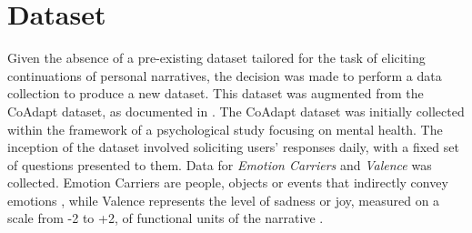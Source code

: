 
\section{Dataset}
Given the absence of a pre-existing dataset tailored for the task of eliciting continuations of personal narratives, the decision was made to perform a data collection to produce a new dataset. This dataset was augmented from the CoAdapt dataset, as documented in \cite{coadapt}. The CoAdapt dataset was initially collected within the framework of a psychological study focusing on mental health. The inception of the dataset involved soliciting users' responses daily, with a fixed set of questions presented to them. Data for \emph{Emotion Carriers} and \emph{Valence} was collected. Emotion Carriers are people, objects or events that indirectly convey emotions \cite{tammewarannotation}, while Valence represents the level of sadness or joy, measured on a scale from -2 to +2, of functional units of the narrative \cite{Ong2021-yt,roccabruna-etal-2022-multi}. 

